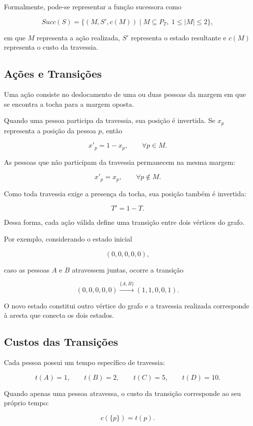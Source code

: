 \documentclass{article}
\begin{document}
Formalmente, pode-se representar a função sucessora como

\[
Succ (S) =
\{(M,S',c(M)) \mid
M \subseteq P_T,\;
1 \leq |M| \leq 2
\},
\]

em que $M$ representa a ação realizada, $S'$ representa o estado resultante e $c(M)$ representa o custo da travessia.

\subsection{Ações e Transições}

Uma ação consiste no deslocamento de uma ou duas pessoas da margem em que se encontra a tocha para a margem oposta.

Quando uma pessoa participa da travessia, sua posição é invertida. Se $x_p$ representa a posição da pessoa $p$, então

\[
x'_p = 1-x_p,
\qquad \forall p \in M.
\]

As pessoas que não participam da travessia permanecem na mesma margem:

\[
x'_p=x_p,
\qquad \forall p \notin M.
\]

Como toda travessia exige a presença da tocha, sua posição também é invertida:

\[
T'=1-T.
\]

Dessa forma, cada ação válida define uma transição entre dois vértices do grafo.

Por exemplo, considerando o estado inicial

\[
(0,0,0,0,0),
\]

caso as pessoas $A$ e $B$ atravessem juntas, ocorre a transição

\[
(0,0,0,0,0)
\xrightarrow{\{A,B\}}
(1,1,0,0,1).
\]

O novo estado constitui outro vértice do grafo e a travessia realizada corresponde à aresta que conecta os dois estados.

\subsection{Custos das Transições}

Cada pessoa possui um tempo específico de travessia:

\[
t(A)=1,\qquad
t(B)=2,\qquad
t(C)=5,\qquad
t(D)=10.
\]

Quando apenas uma pessoa atravessa, o custo da transição corresponde ao seu próprio tempo:

\[
c(\{p\})=t(p).
\]
\end{document}
